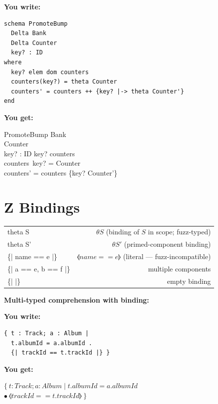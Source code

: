 \documentclass[10pt,landscape,a4paper]{article}
\newenvironment{exwrite}%
  {\par\nobreak\noindent\scriptsize\textbf{You write:}\par\nobreak\vspace{0pt}\scriptsize}%
  {\vspace{1pt}\nobreak}
\newenvironment{exget}%
  {\par\nobreak\noindent\scriptsize\textbf{You get:}\par\nobreak\vspace{0pt}\small}%
  {\par\vspace{3pt}}
\begin{document}
\begin{multicols}{2}
\begin{exwrite}%
\begin{verbatim}
schema PromoteBump
  Delta Bank
  Delta Counter
  key? : ID
where
  key? elem dom counters
  counters(key?) = theta Counter
  counters' = counters ++ {key? |-> theta Counter'}
end
\end{verbatim}
\end{exwrite}
\begin{exget}%
\begin{schema}{PromoteBump}
\Delta Bank \\
\Delta Counter \\
key? : ID
\where
key? \in \dom counters \\
counters~key? = \theta Counter \\
counters' = counters \oplus \{key? \mapsto \theta Counter'\}
\end{schema}
\end{exget}

\section{Z Bindings}

\begin{tabularx}{\columnwidth}{LR}
theta S                & $\theta S$ (binding of $S$ in scope; fuzz-typed) \\
theta S'               & $\theta S'$ (primed-component binding) \\
\{| name == e |\}      & $\lblot name == e \rblot$ (literal — fuzz-incompatible) \\
\{| a == e, b == f |\} & multiple components \\
\{| |\}                & empty binding \\
\end{tabularx}

\smallskip
{}
\textbf{Multi-typed comprehension with binding:}

\begin{exwrite}
\begin{verbatim}
{ t : Track; a : Album |
  t.albumId = a.albumId .
  {| trackId == t.trackId |} }
\end{verbatim}
\end{exwrite}
\begin{exget}
\begin{center}
$\{~ t : Track; a : Album \mid t.albumId = a.albumId$\\
$\bullet~ \lblot trackId == t.trackId \rblot ~\}$
\end{center}
\end{exget}


\end{multicols}
\end{document}
